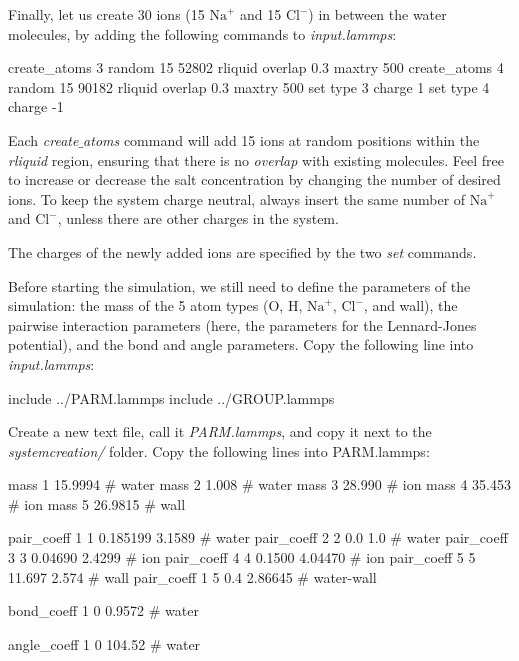 \vspace{0.25cm} \noindent Finally, let us create 30 ions (15 $\text{Na}^+$
and 15 $\text{Cl}^-$)
in between the water molecules, by adding the following commands to \textit{input.lammps}:

\begin{lcverbatim}
create_atoms 3 random 15 52802 rliquid overlap 0.3 maxtry 500
create_atoms 4 random 15 90182 rliquid overlap 0.3 maxtry 500
set type 3 charge 1
set type 4 charge -1
\end{lcverbatim}

\noindent Each \textit{create$\_$atoms} command will add 15 ions at random positions
within the \textit{rliquid} region, ensuring that there is no \textit{overlap} with existing
molecules. Feel free to increase or decrease the salt
concentration by changing the number of desired ions. To keep the system charge neutral,
always insert the same number of 
$\text{Na}^+$
and $\text{Cl}^-$,
unless there are other charges in the system.

\vspace{0.25cm} \noindent The charges of the newly added ions are specified by the two \textit{set} commands.

\vspace{0.25cm} \noindent Before starting the simulation, we still need to define the parameters of the simulation: the mass
of the 5 atom types (O, H, $\text{Na}^+$, $\text{Cl}^-$, and wall), the
pairwise interaction parameters (here, the parameters for the
Lennard-Jones potential), and the bond and angle parameters.
Copy the following line into \textit{input.lammps}:

\begin{lcverbatim}
include ../PARM.lammps
include ../GROUP.lammps
\end{lcverbatim}

\noindent Create a new text file, call it \textit{PARM.lammps}, and copy it
next to the \textit{systemcreation/} folder. Copy the following lines
into PARM.lammps:

\begin{lcverbatim}
mass 1 15.9994 # water
mass 2 1.008 # water
mass 3 28.990 # ion
mass 4 35.453 # ion
mass 5 26.9815 # wall

pair_coeff 1 1 0.185199 3.1589 # water
pair_coeff 2 2 0.0 1.0 # water
pair_coeff 3 3 0.04690 2.4299 # ion
pair_coeff 4 4 0.1500 4.04470 # ion
pair_coeff 5 5 11.697 2.574 # wall
pair_coeff 1 5 0.4 2.86645 # water-wall

bond_coeff 1 0 0.9572 # water

angle_coeff 1 0 104.52 # water
\end{lcverbatim}

